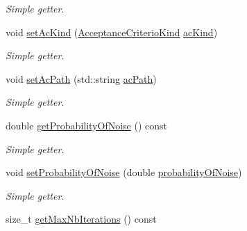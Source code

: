 \begin{DoxyCompactItemize}
\begin{DoxyCompactList}\small\item\em Simple getter. \end{DoxyCompactList}\item 
\hypertarget{classALNS__Parameters_a6461ccc2cc454ac777f6ea96f75ee6b3}{void \hyperlink{classALNS__Parameters_a6461ccc2cc454ac777f6ea96f75ee6b3}{set\-Ac\-Kind} (\hyperlink{classALNS__Parameters_addd5421947a7a1a533fec576f37560c7}{Acceptance\-Criterio\-Kind} \hyperlink{classALNS__Parameters_ac87749e7f117607ca350422f6053303f}{ac\-Kind})}\label{classALNS__Parameters_a6461ccc2cc454ac777f6ea96f75ee6b3}

\begin{DoxyCompactList}\small\item\em Simple getter. \end{DoxyCompactList}\item 
\hypertarget{classALNS__Parameters_a2a9425018145a6286424bb69b6e0fc78}{void \hyperlink{classALNS__Parameters_a2a9425018145a6286424bb69b6e0fc78}{set\-Ac\-Path} (std\-::string \hyperlink{classALNS__Parameters_aa5ec5bd7cd255c818888969a1711605e}{ac\-Path})}\label{classALNS__Parameters_a2a9425018145a6286424bb69b6e0fc78}

\begin{DoxyCompactList}\small\item\em Simple getter. \end{DoxyCompactList}\item 
\hypertarget{classALNS__Parameters_a4733612b400549d2ff4a9b3a0280ba3c}{double \hyperlink{classALNS__Parameters_a4733612b400549d2ff4a9b3a0280ba3c}{get\-Probability\-Of\-Noise} () const }\label{classALNS__Parameters_a4733612b400549d2ff4a9b3a0280ba3c}

\begin{DoxyCompactList}\small\item\em Simple getter. \end{DoxyCompactList}\item 
\hypertarget{classALNS__Parameters_a17f2954f75c8bc57ac3ec1716f6346af}{void \hyperlink{classALNS__Parameters_a17f2954f75c8bc57ac3ec1716f6346af}{set\-Probability\-Of\-Noise} (double \hyperlink{classALNS__Parameters_ade0d6fac20ee1d90c5a5a4e0f2f3ac5a}{probability\-Of\-Noise})}\label{classALNS__Parameters_a17f2954f75c8bc57ac3ec1716f6346af}

\begin{DoxyCompactList}\small\item\em Simple getter. \end{DoxyCompactList}\item 
\hypertarget{classALNS__Parameters_a8982fc2669224f8c2bfa14e2ad5a886b}{size\-\_\-t \hyperlink{classALNS__Parameters_a8982fc2669224f8c2bfa14e2ad5a886b}{get\-Max\-Nb\-Iterations} () const }\label{classALNS__Parameters_a8982fc2669224f8c2bfa14e2ad5a886b}


\end{DoxyCompactItemize}
